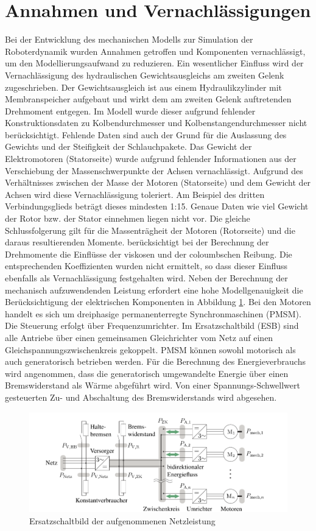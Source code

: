 \section{Annahmen und Vernachlässigungen}
Bei der Entwicklung des mechanischen Modells zur Simulation der Roboterdynamik wurden Annahmen getroffen und Komponenten vernachlässigt, um den Modellierungsaufwand zu reduzieren. Ein wesentlicher Einfluss wird der Vernachlässigung des hydraulischen Gewichtsausgleichs am zweiten Gelenk zugeschrieben. Der Gewichtsausgleich ist aus einem Hydraulikzylinder mit Membranspeicher aufgebaut und wirkt dem am zweiten Gelenk auftretenden Drehmoment entgegen. Im Modell wurde dieser aufgrund fehlender Konstruktionsdaten zu Kolbendurchmesser und Kolbenstangendurchmesser nicht berücksichtigt. Fehlende Daten sind auch der Grund für die Auslassung des Gewichts und der Steifigkeit der Schlauchpakete. Das Gewicht der Elektromotoren (Statorseite) wurde aufgrund fehlender Informationen aus der Verschiebung der Massenschwerpunkte der Achsen vernachlässigt. Aufgrund des Verhältnisses zwischen der Masse der Motoren (Statorseite) und dem Gewicht der Achsen  wird diese Vernachlässigung toleriert. Am Beispiel des dritten Verbindungsglieds beträgt dieses mindesten 1:15. Genaue Daten wie viel Gewicht der Rotor bzw. der Stator einnehmen liegen nicht vor.  Die gleiche Schlussfolgerung gilt für die Massenträgheit der Motoren (Rotorseite) und die daraus resultierenden Momente. \cite[S.~287~f.]{Grimble.2009} berücksichtigt bei der Berechnung der Drehmomente die Einflüsse der viskosen und der coloumbschen Reibung. Die entsprechenden Koeffizienten wurden nicht ermittelt, so dass dieser Einfluss ebenfalls als Vernachlässigung festgehalten wird. Neben der Berechnung der mechanisch aufzuwendenden Leistung erfordert eine hohe Modellgenauigkeit die Berücksichtigung der elektrischen Komponenten in Abbildung \ref{fig:zk}. Bei den Motoren handelt es sich um dreiphasige permanenterregte Synchronmaschinen (PMSM).  Die Steuerung erfolgt über Frequenzumrichter. Im Ersatzschaltbild (ESB) sind alle Antriebe über einen gemeinsamen Gleichrichter vom Netz auf einen Gleichspannungszwischenkreis gekoppelt. PMSM können sowohl motorisch als auch generatorisch betrieben werden. Für die Berechnung des Energieverbrauchs wird angenommen, dass die generatorisch umgewandelte Energie über einen Bremswiderstand als Wärme abgeführt wird. Von einer Spannungs-Schwellwert gesteuerten Zu- und Abschaltung des Bremswiderstands wird abgesehen. \cite[S.~21~ff.]{Eggers.2019}
%
\begin{figure}[tbph]
	\centering
	\includegraphics[width=1\linewidth]{images/zk}
	\caption{Ersatzschaltbild der aufgenommenen Netzleistung \cite[S.~20]{Eggers.2019}}
	\label{fig:zk}
\end{figure}